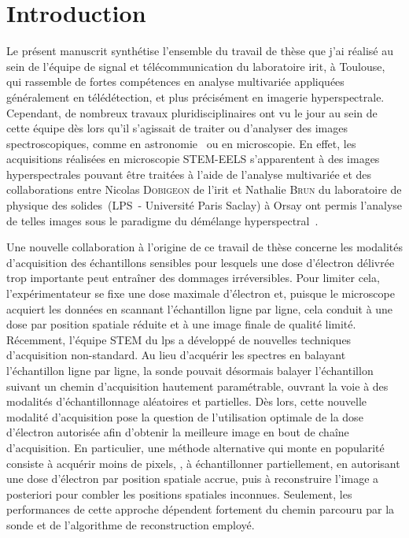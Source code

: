 
\chapter{Introduction}
\label{ch:introduction}


 
Le présent manuscrit synthétise l'ensemble du travail de thèse que j'ai réalisé au sein de l'équipe de signal et télécommunication du laboratoire \gls{irit}, à Toulouse, qui rassemble de fortes compétences en analyse multivariée appliquées généralement en télédétection, et plus précisément en imagerie hyperspectrale. Cependant, de nombreux travaux pluridisciplinaires ont vu le jour au sein de cette équipe dès lors qu'il s'agissait de traiter ou d'analyser des images spectroscopiques, comme en astronomie~\cite{guilloteau2020simulated, guilloteau2020fusion} ou en microscopie. En effet, les acquisitions réalisées en microscopie STEM-EELS s'apparentent à des images hyperspectrales pouvant être traitées à l'aide de l'analyse multivariée et des collaborations entre Nicolas \textsc{Dobigeon} de l'\gls{irit} et Nathalie \textsc{Brun} du laboratoire de physique des solides~(LPS~- Université Paris Saclay) à Orsay ont permis l'analyse de telles images sous le paradigme du démélange hyperspectral~\cite{dobigeon2012spectral, dobigeon2016linear}.

Une nouvelle collaboration à l'origine de ce travail de thèse concerne les modalités d'acquisition des échantillons sensibles pour lesquels une dose d'électron délivrée trop importante peut entraîner des dommages irréversibles. Pour limiter cela, l'expérimentateur se fixe une dose maximale d'électron et, puisque le microscope acquiert les données en scannant l'échantillon ligne par ligne, cela conduit à une dose par position spatiale réduite et à une image finale de qualité limité.
%
Récemment, l'équipe STEM du \gls{lps} a développé de nouvelles techniques d'acquisition non-standard. Au lieu d'acquérir les spectres en balayant l'échantillon ligne par ligne, la sonde pouvait désormais balayer l'échantillon suivant un chemin d'acquisition hautement paramétrable, ouvrant la voie à des modalités d'échantillonnage aléatoires et partielles. 
%
Dès lors, cette nouvelle modalité d'acquisition pose la question de l'utilisation optimale de la dose d'électron autorisée afin d'obtenir la meilleure image en bout de chaîne d'acquisition. 
%
En particulier, une méthode alternative qui monte en popularité consiste à acquérir moins de pixels, \ie{}, à échantillonner partiellement, en autorisant une dose d'électron par position spatiale accrue, puis à reconstruire l'image a posteriori pour combler les positions spatiales inconnues. Seulement, les performances de cette approche dépendent fortement du chemin parcouru par la sonde et de l'algorithme de reconstruction employé.

